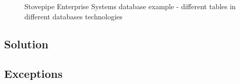 \begin{figure}[htp]
\hfill%
%
\caption[Stovepipe Enterprise Systems database example]{Stovepipe Enterprise Systems database example - different tables in different databases technologies}
\label{fig:DatabaseExample}
\end{figure}


\subsection{Solution}



\subsection{Exceptions}